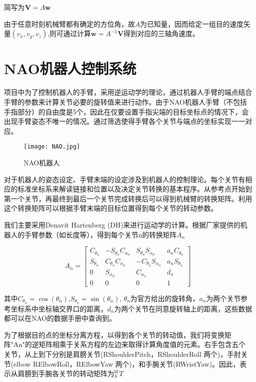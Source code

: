 	简写为$\textbf {V}  = {A}\textbf w $
	
	由于任意时刻机械臂都有确定的方位角，故$A$为已知量，因而给定一组目的速度矢量$(v_x,v_y,v_z)$,则可通过计算$\textbf {w}=A^{-1}\textbf {V}$得到对应的三轴角速度。


\section{NAO机器人控制系统}
项目中为了控制机器人的手臂，采用逆运动学的理论，通过机器人手臂的端点结合手臂的参数来计算关节必要的旋转值来进行动作。由于NAO机器人手臂（不包括手指部分）的自由度是5个，因此在仅要设置手指尖端的目标坐标点的情况下，会出现手臂姿态不唯一的情况。通过筛选使得手臂各个关节与端点的坐标实现一一对应。

\begin{figure}[htbp]
\small
\centering
\texttt{[image: NAO.jpg]}
\caption{NAO机器人} 
\end{figure}

对于机器人的姿态设定、手臂末端的设定涉及到机器人的控制理论。每个关节有相应的标准坐标系来解读链接和位置以及决定关节转换的基本程序。从参考点开始到第一个关节，再最终到最后一个关节完成转换后可以得到机械臂的转换矩阵。利用这个转换矩阵可以根据手臂末端的目标位置得到每个关节的转动参数。

我们主要采用Denavit Hartenberg (DH)来进行运动学的计算。根据厂家提供的机器人的手臂参数（如长度等），得到每个关节n的转换矩阵$A_n$

\begin{equation}
{{A}_n} = \left[ {\begin{array}{*{20}{c}}
	{{C_{{\theta _n}}}}&{ - {S_{{\theta _n}}}{C_{{\alpha _n}}}}&{{S_{{\theta _n}}}{S_{{\alpha _n}}}}&{{a_n}{C_{{\theta _n}}}}\\
	{{S_{{\theta _n}}}}&{{C_{{\theta _n}}}{C_{{\alpha _n}}}}&{ - {C_{{\theta _n}}}{S_{{\alpha _n}}}}&{{a_n}{S_{{\theta _n}}}}\\
	0&{{S_{{\alpha _n}}}}&{{C_{{\alpha _n}}}}&{{d_n}}\\
	0&0&0&1
	\end{array}} \right]
\end{equation}

其中${C_{{\theta _n}}} = \cos ({\theta _n})$,${S_{{\theta _n}}} = \sin ({\theta _n})$, ${{\theta }_{n}}$为官方给出的旋转角，$a_n$为两个关节参考坐标系中坐标轴交界口的距离，$d_n$为两个关节在同意旋转轴上的距离，这些数据都可以在NAO的数据手册中查询到。

为了根据目的点的坐标分离方程，以得到各个关节的转动值，我们将变换矩阵"An"的逆矩阵相乘于关系方程的左边来取得计算角度值的元素。右手包含五个关节，从上到下分别是肩膀关节(RShoulderPitch，RShoulderRoll 两个)，手肘关节(elbow RElbowRoll，RElbowYaw 两个)，和手腕关节(RWristYaw)。因此，表示从肩膀到手腕各关节的转动矩阵为${}_{S}^{W}{T}$

